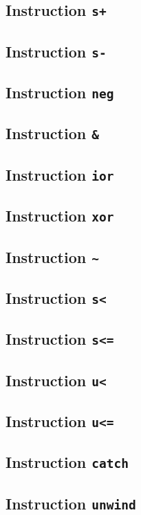 \subsection{Instruction \texttt{s+}}
\label{mir-instruction-s+}

\subsection{Instruction \texttt{s-}}
\label{mir-instruction-s-}

\subsection{Instruction \texttt{neg}}
\label{mir-instruction-neg}

\subsection{Instruction \texttt{\&}}
\label{mir-instruction-and}

\subsection{Instruction \texttt{ior}}
\label{mir-instruction-ior}

\subsection{Instruction \texttt{xor}}
\label{mir-instruction-xor}

\subsection{Instruction \texttt{\~}}
\label{mir-instruction-not}

\subsection{Instruction \texttt{s<}}
\label{mir-instruction-s-less}

\subsection{Instruction \texttt{s<=}}
\label{mir-instruction-s-less-or-equal}

\subsection{Instruction \texttt{u<}}
\label{mir-instruction-u-less}

\subsection{Instruction \texttt{u<=}}
\label{mir-instruction-u-less-or-equal}

\subsection{Instruction \texttt{catch}}
\label{mir-instruction-catch}

\subsection{Instruction \texttt{unwind}}
\label{mir-instruction-unwind}
